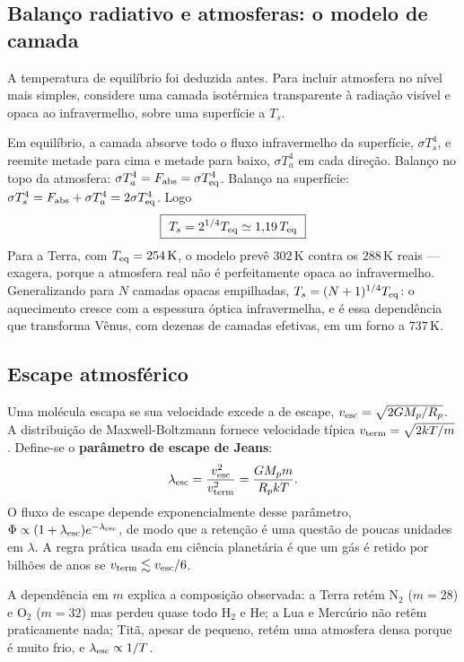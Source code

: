 \documentclass[11pt,a4paper]{article}
\begin{document}
\subsection*{Balanço radiativo e atmosferas: o modelo de camada}

A temperatura de equilíbrio foi deduzida antes. Para incluir atmosfera no nível mais simples, considere uma camada isotérmica transparente à radiação visível e opaca ao infravermelho, sobre uma superfície a $T_s$.

Em equilíbrio, a camada absorve todo o fluxo infravermelho da superfície, $\sigma T_s^{4}$, e reemite metade para cima e metade para baixo, $\sigma T_a^{4}$ em cada direção. Balanço no topo da atmosfera: $\sigma T_a^{4}=F_{\rm abs}=\sigma T_{\rm eq}^{4}$. Balanço na superfície: $\sigma T_s^{4}=F_{\rm abs}+\sigma T_a^{4}=2\sigma T_{\rm eq}^{4}$. Logo
\[
\boxed{\ T_s=2^{1/4}T_{\rm eq}\simeq1{,}19\,T_{\rm eq}\ }
\]
Para a Terra, com $T_{\rm eq}=254\,\mathrm{K}$, o modelo prevê $302\,\mathrm{K}$ contra os $288\,\mathrm{K}$ reais --- exagera, porque a atmosfera real não é perfeitamente opaca ao infravermelho. Generalizando para $N$ camadas opacas empilhadas, $T_s=(N+1)^{1/4}T_{\rm eq}$: o aquecimento cresce com a espessura óptica infravermelha, e é essa dependência que transforma Vênus, com dezenas de camadas efetivas, em um forno a $737\,\mathrm{K}$.

\subsection*{Escape atmosférico}

Uma molécula escapa se sua velocidade excede a de escape, $v_{\rm esc}=\sqrt{2GM_p/R_p}$. A distribuição de Maxwell-Boltzmann fornece velocidade típica $v_{\rm term}=\sqrt{2kT/m}$. Define-se o \textbf{parâmetro de escape de Jeans}:
\[
\lambda_{\rm esc}=\frac{v_{\rm esc}^{2}}{v_{\rm term}^{2}}=\frac{GM_pm}{R_pkT}.
\]
O fluxo de escape depende exponencialmente desse parâmetro, $\Phi\propto(1+\lambda_{\rm esc})e^{-\lambda_{\rm esc}}$, de modo que a retenção é uma questão de poucas unidades em $\lambda$. A regra prática usada em ciência planetária é que um gás é retido por bilhões de anos se $v_{\rm term}\lesssim v_{\rm esc}/6$.

A dependência em $m$ explica a composição observada: a Terra retém N$_2$ ($m=28$) e O$_2$ ($m=32$) mas perdeu quase todo H$_2$ e He; a Lua e Mercúrio não retêm praticamente nada; Titã, apesar de pequeno, retém uma atmosfera densa porque é muito frio, e $\lambda_{\rm esc}\propto1/T$.
\end{document}
